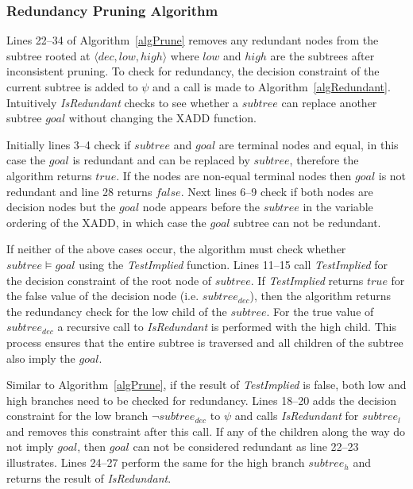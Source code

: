 \documentclass[twoside,11pt]{article}
\begin{document}
\decmargin{.5em}
\subsubsection{Redundancy Pruning Algorithm}

Lines 22--34 of Algorithm~\ref{algPrune} removes any redundant nodes from the subtree rooted at $\langle \mathit{dec}, low, high \rangle$ where $low$ and $high$ are the subtrees after inconsistent pruning. To check for redundancy, the decision constraint of the current subtree is added to $\psi$ and a call is made to Algorithm~\ref{algRedundant}. Intuitively \emph{IsRedundant} checks to see whether a $\mathit{subtree}$ can replace another subtree $\mathit{goal}$ without changing the XADD function. 

Initially lines 3--4 check if  $\mathit{subtree}$ and $\mathit{goal}$ are terminal nodes and equal, in this case the $\mathit{goal}$ is redundant and can be replaced by $\mathit{subtree}$, therefore the algorithm returns $\mathit{true}$. If the nodes are non-equal terminal nodes then $\mathit{goal}$ is not redundant and line 28 returns $\mathit{false}$. Next lines 6--9 check if both nodes are decision nodes but the $\mathit{goal}$ node appears before the $\mathit{subtree}$ in the variable ordering of the XADD, in which case the $\mathit{goal}$ subtree can not be redundant. 

If neither of the above cases occur, the algorithm must check whether $\mathit{subtree} \models \mathit{goal}$ using the  \emph{TestImplied} function. Lines 11--15 call \emph{TestImplied} for the decision constraint of the root node of $\mathit{subtree}$. If  \emph{TestImplied} returns $\mathit{true}$ for the false value of the decision node (i.e. $\mathit{subtree}_{\mathit{dec}}$), then the algorithm returns the redundancy check for the low child of the $\mathit{subtree}$. For the true value of $\mathit{subtree}_{\mathit{dec}}$ a recursive call to \emph{IsRedundant} is performed with the high child. This process ensures that the entire subtree is traversed and all children of the subtree also imply the $\mathit{goal}$. 

Similar to Algorithm~\ref{algPrune}, if the result of \emph{TestImplied} is false, both low and high branches need to be checked for redundancy. Lines 18--20 adds the decision constraint for the low branch $\neg \mathit{subtree}_{\mathit{dec}}$ to $\psi$ and calls \emph{IsRedundant} for $\mathit{subtree}_l$ and removes this constraint after this call. If any of the children along the way do not imply $\mathit{goal}$, then $\mathit{goal}$ can not be considered redundant as line 22--23 illustrates. 
Lines 24--27 perform the same for the high branch $\mathit{subtree}_h$ and returns the result of \emph{IsRedundant}.
\end{document}
